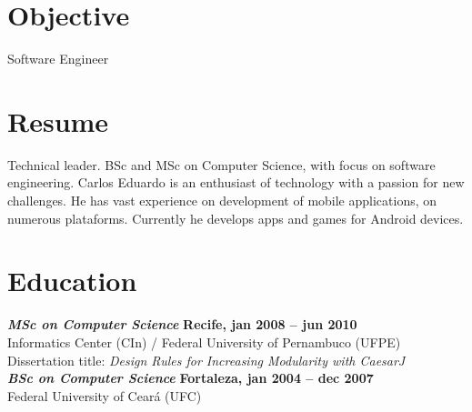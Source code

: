 \documentclass[margin, 10pt]{res} %
\begin{document}
\begin{resume}

 \vspace{-0.05in}
\section{Objective}  

Software Engineer

 
\section{Resume}  

Technical leader. BSc and MSc on Computer Science, with focus on software engineering. Carlos Eduardo is an enthusiast of technology with a passion for new challenges. He has vast experience on development of mobile applications, on numerous plataforms. Currently he develops apps and games for Android devices.


\section{Education}

{\sl\bf MSc on Computer Science} \hfill {\bf Recife, jan 2008 -- jun 2010} \\
Informatics Center (CIn) / Federal University of Pernambuco (UFPE) \\
Dissertation title: {\sl Design Rules for Increasing Modularity with CaesarJ}
\vspace{0.1in}
\\{\sl\bf BSc on Computer Science} \hfill {\bf Fortaleza, jan 2004 -- dec 2007} \\
Federal University of Ceará (UFC)  
 
 

 

\end{resume}
\end{document}
